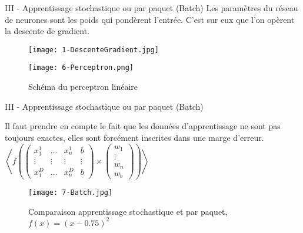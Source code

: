 \begin{frame}{III - Apprentissage stochastique ou par paquet (Batch)}
    Les paramètres du réseau de neurones sont les poids qui pondèrent l'entrée. C'est sur eux que l'on opèrent la descente de gradient. 
    \begin{figure}
        \centering
        \texttt{[image: 1-DescenteGradient.jpg]}
    \end{figure}
    \begin{figure}
        \centering
        \texttt{[image: 6-Perceptron.png]}
        \caption{Schéma du perceptron linéaire}
    \end{figure}
\end{frame}

\begin{frame}{III - Apprentissage stochastique ou par paquet (Batch)}
    \begin{multicols}{2}
        Il faut prendre en compte le fait que les données d'apprentissage ne sont pas toujours exactes, elles sont forcément inscrites dans une marge d'erreur. 
        \columnbreak
        $
            \left< f
            \left(
            \begin{pmatrix}
                    x_1^{1} & \ldots & x_n^{1} & b      \\
                    \vdots  & \vdots & \vdots  & \vdots \\
                    x_1^{D} & \ldots & x_n^{D} & b
                \end{pmatrix}
            \times
            \begin{pmatrix}
                    w_1    \\
                    \vdots \\
                    w_n    \\
                    w_b
                \end{pmatrix}
            \right) \right>
        $
    \end{multicols}
    \begin{figure}
        \centering
        \texttt{[image: 7-Batch.jpg]}
        \caption{Comparaison apprentissage stochastique et par paquet, $f(x) = (x-0.75)^2$}
    \end{figure}
\end{frame}
